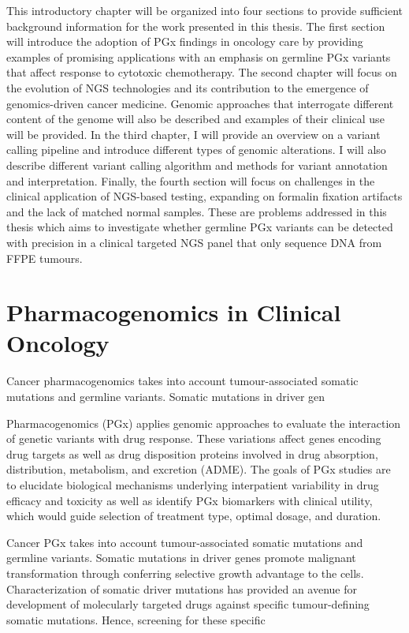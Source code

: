This introductory chapter will be organized into four sections to provide sufficient background information for the work presented in this thesis. The first section will introduce the adoption of PGx findings in oncology care by providing examples of promising applications with an emphasis on germline PGx variants that affect response to cytotoxic chemotherapy. The second chapter will focus on the evolution of NGS technologies and its contribution to the emergence of genomics-driven cancer medicine. Genomic approaches that interrogate different content of the genome will also be described and examples of their clinical use will be provided. In the third chapter, I will provide an overview on a variant calling pipeline and introduce different types of genomic alterations. I will also describe different variant calling algorithm and methods for variant annotation and interpretation. Finally, the fourth section will focus on challenges in the clinical application of NGS-based testing, expanding on formalin fixation artifacts and the lack of matched normal samples. These are problems addressed in this thesis which aims to investigate whether germline PGx variants can be detected with precision in a clinical targeted NGS panel that only sequence DNA from FFPE tumours.

\section{Pharmacogenomics in Clinical Oncology}
\label{sec:PharmacogenomicsinClinicalOncology}

Cancer pharmacogenomics takes into account tumour-associated somatic mutations and germline variants. Somatic mutations in driver gen

Pharmacogenomics (PGx) applies genomic approaches to evaluate the interaction of genetic variants with drug response. These variations affect genes encoding drug targets as well as drug disposition proteins involved in drug absorption, distribution, metabolism, and excretion (ADME). The goals of PGx studies are to elucidate biological mechanisms underlying interpatient variability in drug efficacy and toxicity as well as identify PGx biomarkers with clinical utility, which would guide selection of treatment type, optimal dosage, and duration.

Cancer PGx takes into account tumour-associated somatic mutations and germline variants. Somatic mutations in driver genes promote malignant transformation through conferring selective growth advantage to the cells. Characterization of somatic driver mutations has provided an avenue for development of molecularly targeted drugs against specific tumour-defining somatic mutations. Hence, screening for these specific

